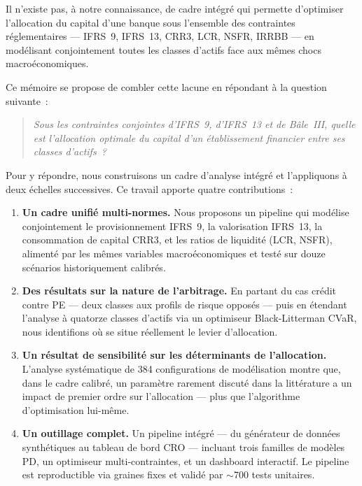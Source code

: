 \documentclass[10pt, a4paper, oneside]{report}
\theoremstyle{definition}
\begin{document}
Il n'existe pas, à notre connaissance, de cadre intégré qui permette d'optimiser l'allocation du capital d'une banque sous l'ensemble des contraintes réglementaires --- IFRS~9, IFRS~13, CRR3, LCR, NSFR, IRRBB --- en modélisant conjointement toutes les classes d'actifs face aux mêmes chocs macroéconomiques.


Ce mémoire se propose de combler cette lacune en répondant à la question suivante~:

\medskip
\begin{quote}
\itshape
Sous les contraintes conjointes d'IFRS~9, d'IFRS~13 et de Bâle~III, quelle est l'allocation optimale du capital d'un établissement financier entre ses classes d'actifs~?
\end{quote}
\medskip

Pour y répondre, nous construisons un cadre d'analyse intégré et l'appliquons à deux échelles successives.
Ce travail apporte quatre contributions~:

\begin{enumerate}
  \item \textbf{Un cadre unifié multi-normes.}
  Nous proposons un pipeline qui modélise conjointement le provisionnement IFRS~9, la valorisation IFRS~13, la consommation de capital CRR3, et les ratios de liquidité (LCR, NSFR), alimenté par les mêmes variables macroéconomiques et testé sur douze scénarios historiquement calibrés.

  \item \textbf{Des résultats sur la nature de l'arbitrage.}
  En partant du cas crédit contre PE --- deux classes aux profils de risque opposés --- puis en étendant l'analyse à quatorze classes d'actifs via un optimiseur Black-Litterman CVaR, nous identifions où se situe réellement le levier d'allocation.

  \item \textbf{Un résultat de sensibilité sur les déterminants de l'allocation.}
  L'analyse systématique de 384 configurations de modélisation montre que, dans le cadre calibré, un paramètre rarement discuté dans la littérature a un impact de premier ordre sur l'allocation --- plus que l'algorithme d'optimisation lui-même.

  \item \textbf{Un outillage complet.}
  Un pipeline intégré --- du générateur de données synthétiques au tableau de bord CRO --- incluant trois familles de modèles PD, un optimiseur multi-contraintes, et un dashboard interactif. Le pipeline est reproductible via graines fixes et validé par $\sim$700 tests unitaires.
\end{enumerate}
\end{document}
